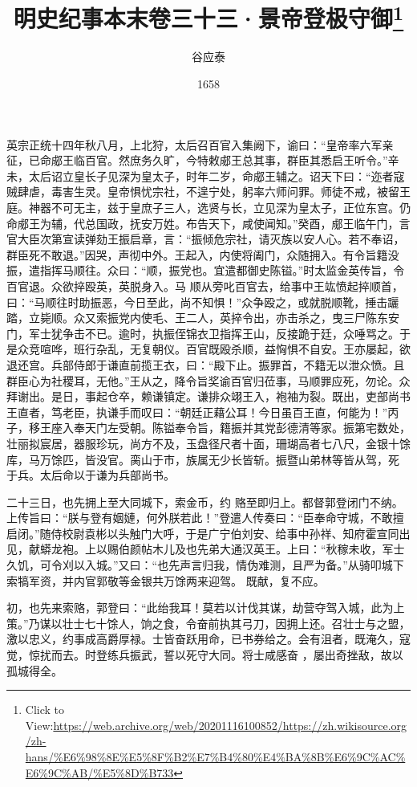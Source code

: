 \documentclass{article}
\title{明史纪事本末卷三十三·景帝登极守御\footnote{Click to View:\url{https://web.archive.org/web/20201116100852/https://zh.wikisource.org/zh-hans/%E6%98%8E%E5%8F%B2%E7%B4%80%E4%BA%8B%E6%9C%AC%E6%9C%AB/%E5%8D%B733}}}
\author{谷应泰}
\date{1658}
\begin{document}

\maketitle


\Large

﻿英宗正统十四年秋八月，上北狩，太后召百官入集阙下，谕曰：“皇帝率六军亲征，已命郕王临百官。然庶务久旷，今特敕郕王总其事，群臣其悉启王听令。”辛未，太后诏立皇长子见深为皇太子，时年二岁，命郕王辅之。诏天下曰：“迩者寇贼肆虐，毒害生灵。皇帝惧忧宗社，不遑宁处，躬率六师问罪。师徒不戒，被留王庭。神器不可无主，兹于皇庶子三人，选贤与长，立见深为皇太子，正位东宫。仍命郕王为辅，代总国政，抚安万姓。布告天下，咸使闻知。”癸酉，郕王临午门，言官大臣次第宣读弹劾王振启章，言：“振倾危宗社，请灭族以安人心。若不奉诏，群臣死不敢退。”因哭，声彻中外。王起入，内使将阖门，众随拥入。有令旨籍没振，遣指挥马顺往。众曰：“顺，振党也。宜遣都御史陈镒。”时太监金英传旨，令百官退。众欲捽殴英，英脱身入。马
\newpage
顺从旁叱百官去，给事中王竑愤起捽顺首，曰：“马顺往时助振恶，今日至此，尚不知惧！”众争殴之，或就脱顺靴，捶击躧踏，立毙顺。众又索振党内使毛、王二人，英捽令出，亦击杀之，曳三尸陈东安门，军士犹争击不已。逾时，执振侄锦衣卫指挥王山，反接跪于廷，众唾骂之。于是众竞喧哗，班行杂乱，无复朝仪。百官既殴杀顺，益恟惧不自安。王亦屡起，欲退还宫。兵部侍郎于谦直前揽王衣，曰：“殿下止。振罪首，不籍无以泄众愤。且群臣心为社稷耳，无他。”王从之，降令旨奖谕百官归莅事，马顺罪应死，勿论。众拜谢出。是日，事起仓卒，赖谦镇定。谦排众翊王入，袍袖为裂。既出，吏部尚书王直者，笃老臣，执谦手而叹曰：“朝廷正藉公耳！今日虽百王直，何能为！”丙子，移王座入奉天门左受朝。陈镒奉令旨，籍振并其党彭德清等家。振第宅数处，壮丽拟宸居，器服珍玩，尚方不及，玉盘径尺者十面，珊瑚高者七八尺，金银十馀库，马万馀匹，皆没官。脔山于市，族属无少长皆斩。振暨山弟林等皆从驾，死
于兵。太后命以于谦为兵部尚书。 

二十三日，也先拥上至大同城下，索金币，约
\newpage
赂至即归上。都督郭登闭门不纳。上传旨曰：“朕与登有姻㜕，何外朕若此！”登遣人传奏曰：“臣奉命守城，不敢擅启闭。”随侍校尉袁彬以头触门大呼，于是广宁伯刘安、给事中孙祥、知府霍宣同出见，献蟒龙袍。上以赐伯颜帖木儿及也先弟大通汉英王。上曰：“秋稼未收，军士久饥，可令刈以入城。”又曰：“也先声言归我，情伪难测，且严为备。”从骑叩城下索犒军资，并内官郭敬等金银共万馀两来迎驾。
既献，复不应。 

初，也先来索赂，郭登曰：“此绐我耳！莫若以计伐其谋，劫营夺驾入城，此为上策。”乃谋以壮士七十馀人，饷之食，令奋前执其弓刀，因拥上还。召壮士与之盟，激以忠义，约事成高爵厚禄。士皆奋跃用命，已书券给之。会有沮者，既淹久，寇觉，惊扰而去。时登练兵振武，誓以死守大同。将士咸感奋
，屡出奇挫敌，故以孤城得全。 
\end{document}

